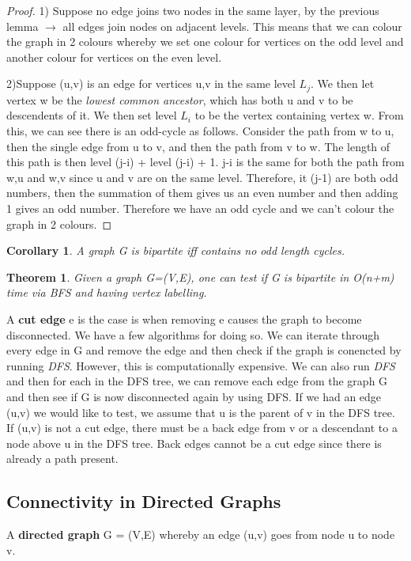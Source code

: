 \documentclass[11pt, oneside]{article}
\newtheorem{theorem}{Theorem}
\newtheorem{corollary}{Corollary}[theorem]
\theoremstyle{definition}
\begin{document}
\begin{proof}
  1) Suppose no edge joins two nodes in the same layer, by the previous lemma $\rightarrow$ all edges join nodes on adjacent levels. This means that we can colour the graph in 2 colours whereby we set one colour for vertices on the odd level and another colour for vertices on the even level.

  2)Suppose (u,v) is an edge for vertices u,v in the same level $L_j$. We then let vertex w be the \textit{lowest common ancestor}, which has both u and v to be descendents of it. We then set level $L_{i}$ to be the vertex containing vertex w. From this, we can see there is an odd-cycle as follows. Consider the path from w to u, then the single edge from u to v, and then the path from v to w. The length of this path is then level (j-i) + level (j-i) + 1. j-i is the same for both the path from w,u and w,v since u and v are on the same level. Therefore, it (j-1) are both odd numbers, then the summation of them gives us an even number and then adding 1 gives an odd number. Therefore we have an odd cycle and we can't colour the graph in 2 colours.
\end{proof}
\begin{corollary}
  A graph G is bipartite iff contains no odd length cycles.
\end{corollary}
\begin{theorem}
  Given a graph G=(V,E), one can test if G is bipartite in O(n+m) time via BFS and having vertex labelling.
\end{theorem}

A \textbf{cut edge} e is the case is when removing e causes the graph to become disconnected. We have a few algorithms for doing so. We can iterate through every edge in G and remove the edge and then check if the graph is conencted by running \textit{DFS}. However, this is computationally expensive. We can also run \textit{DFS} and then for each in the DFS tree, we can remove each edge from the graph G and then see if G is now disconnected again by using DFS. If we had an edge (u,v) we would like to test, we assume that u is the parent of v in the DFS tree. If (u,v) is not a cut edge, there must be a back edge from v or a descendant to a node above u in the DFS tree. Back edges cannot be a cut edge since there is already a path present.

\subsection{Connectivity in Directed Graphs}
A \textbf{directed graph} G = (V,E) whereby an edge (u,v) goes from node u to node v.
\end{document}
